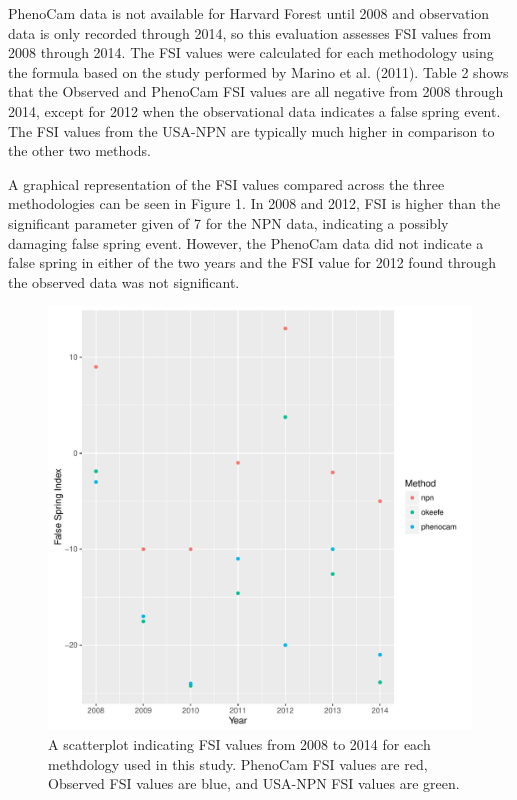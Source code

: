 \documentclass{article}\usepackage[]{graphicx}\usepackage[]{color}
\makeatletter
\def\maxwidth{ %
  \ifdim\Gin@nat@width>\linewidth
    \linewidth
  \else
    \Gin@nat@width
  \fi
}
\makeatother
\begin{document}
PhenoCam data is not available for Harvard Forest until 2008 and observation data is only recorded through 2014, so this evaluation assesses FSI values from 2008 through 2014.
The FSI values were calculated for each methodology using the formula based on the study performed by Marino et al. (2011). Table 2 shows that the Observed and PhenoCam FSI values are all negative from 2008 through 2014, except for 2012 when the observational data indicates a false spring event. The FSI values from the USA-NPN are typically much higher in comparison to the other two methods.  
\par
A graphical representation of the FSI values compared across the three methodologies can be seen in Figure 1. In 2008 and 2012, FSI is higher than the significant parameter given of 7 for the NPN data, indicating a possibly damaging false spring event. However, the PhenoCam data did not indicate a false spring in either of the two years and the FSI value for 2012 found through the observed data was not significant.

\begin{figure}[H]
\includegraphics[width=\maxwidth]{figure/fsifig-1} \caption[A scatterplot indicating FSI values from 2008 to 2014 for each methdology used in this study]{A scatterplot indicating FSI values from 2008 to 2014 for each methdology used in this study. PhenoCam FSI values are red, Observed FSI values are blue, and USA-NPN FSI values are green.}\label{fig:fsifig}
\end{figure}
\end{document}

